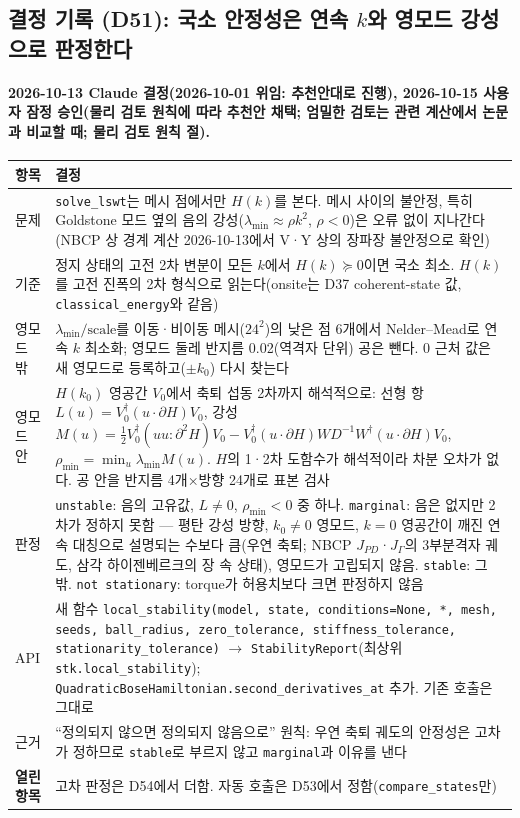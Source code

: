 \subsection{결정 기록 (D51): 국소 안정성은 연속 $k$와 영모드 강성으로 판정한다}\label{decisions-d51-local-stability}
\begingroup%
  \framesubtitle{2026-10-13 Claude 결정(2026-10-01 위임: 추천안대로 진행), 2026-10-15 사용자 잠정 승인(물리 검토 원칙에 따라 추천안 채택; 엄밀한 검토는 관련 계산에서 논문과 비교할 때; 물리 검토 원칙 절).}
  \small\renewcommand{\arraystretch}{1.12}
  \begin{tabularx}{\textwidth}{@{}P{3.0cm}Y@{}}
    \toprule
    항목 & 결정 \\
    \midrule
    문제 & \texttt{solve\_lswt}는 메시 점에서만 $H(k)$를 본다. 메시 사이의 불안정, 특히 Goldstone 모드 옆의 음의 강성($\lambda_{\min}\approx\rho k^2$, $\rho<0$)은 오류 없이 지나간다(NBCP 상 경계 계산 2026-10-13에서 V·Y 상의 장파장 불안정으로 확인) \\
    기준 & 정지 상태의 고전 2차 변분이 모든 $k$에서 $H(k)\succeq0$이면 국소 최소. $H(k)$를 고전 진폭의 2차 형식으로 읽는다(onsite는 D37 coherent-state 값, \texttt{classical\_energy}와 같음) \\
    영모드 밖 & $\lambda_{\min}/\text{scale}$를 이동·비이동 메시($24^2$)의 낮은 점 6개에서 Nelder--Mead로 연속 $k$ 최소화; 영모드 둘레 반지름 0.02(역격자 단위) 공은 뺀다. 0 근처 값은 새 영모드로 등록하고($\pm k_0$) 다시 찾는다 \\
    영모드 안 & $H(k_0)$ 영공간 $V_0$에서 축퇴 섭동 2차까지 해석적으로: 선형 항 $L(u)=V_0^\dagger(u\cdot\partial H)V_0$, 강성 $M(u)=\tfrac12V_0^\dagger(uu:\partial^2H)V_0-V_0^\dagger(u\cdot\partial H)WD^{-1}W^\dagger(u\cdot\partial H)V_0$, $\rho_{\min}=\min_u\lambda_{\min}M(u)$. $H$의 1·2차 도함수가 해석적이라 차분 오차가 없다. 공 안을 반지름 4개×방향 24개로 표본 검사 \\
    판정 & \texttt{unstable}: 음의 고유값, $L\ne0$, $\rho_{\min}<0$ 중 하나. \texttt{marginal}: 음은 없지만 2차가 정하지 못함 — 평탄 강성 방향, $k_0\ne0$ 영모드, $k=0$ 영공간이 깨진 연속 대칭으로 설명되는 수보다 큼(우연 축퇴; NBCP $J_{PD}$·$J_\Gamma$의 3부분격자 궤도, 삼각 하이젠베르크의 장 속 상태), 영모드가 고립되지 않음. \texttt{stable}: 그 밖. \texttt{not stationary}: torque가 허용치보다 크면 판정하지 않음 \\
    API & 새 함수 \texttt{local\_stability(model, state, conditions=None, *, mesh, seeds, ball\_radius, zero\_tolerance, stiffness\_tolerance, stationarity\_tolerance)} $\to$ \texttt{StabilityReport}(최상위 \texttt{stk.local\_stability}); \texttt{QuadraticBoseHamiltonian.second\_derivatives\_at} 추가. 기존 호출은 그대로 \\
    근거 & ``정의되지 않으면 정의되지 않음으로'' 원칙: 우연 축퇴 궤도의 안정성은 고차가 정하므로 \texttt{stable}로 부르지 않고 \texttt{marginal}과 이유를 낸다 \\
    \textbf{열린 항목} & 고차 판정은 D54에서 더함. 자동 호출은 D53에서 정함(\texttt{compare\_states}만) \\
    \bottomrule
  \end{tabularx}
\endgroup


